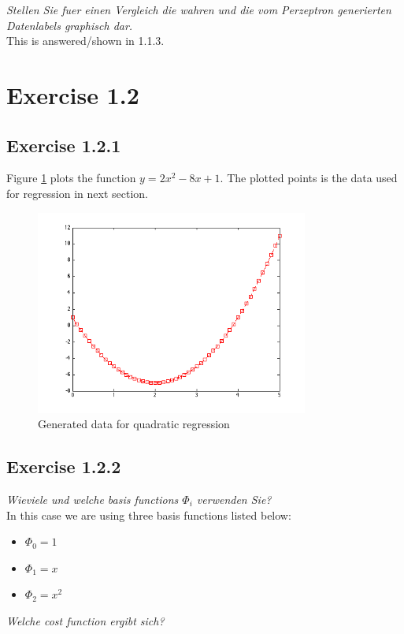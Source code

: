 \documentclass[12pt]{article}
\begin{document}
\textit{Stellen Sie fuer einen Vergleich die wahren und die vom Perzeptron generierten Datenlabels graphisch dar.}
\\
This is answered/shown in 1.1.3.

\section{Exercise 1.2}
\subsection{Exercise 1.2.1}

Figure \ref{fig:dataQuadReg} plots the function $y=2x^2 - 8x + 1$. The plotted points is the data used for regression in next section.

\begin{figure}[htp]
	\centering
	\includegraphics[width=0.8\textwidth]{ab1_2_1.png}
	\caption{Generated data for quadratic regression}
	\label{fig:dataQuadReg}
\end{figure}

\subsection{Exercise 1.2.2}
\textit{Wieviele und welche basis functions $\Phi_i$ verwenden Sie? }\\

In this case we are using three basis functions listed below:
\begin{itemize}
\item $\Phi_0=1$
\item $\Phi_1=x$
\item $\Phi_2=x^2$
\end{itemize}
\textit{Welche cost function ergibt sich?}
\end{document}
